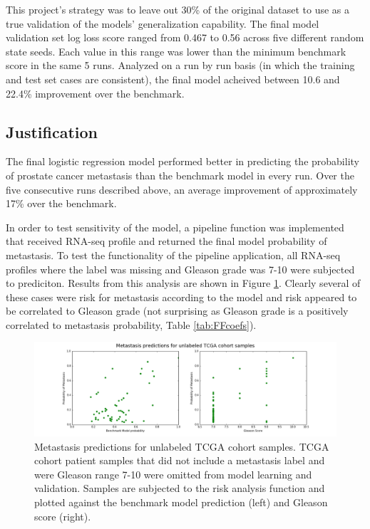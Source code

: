 \documentclass[final]{article}
\begin{document}
This project's strategy was to leave out 30\% of the original dataset to use as a
true validation of the models' generalization capability.  The final model validation
set log loss score ranged from 0.467 to 0.56 across five different random state
seeds.  Each value in this range was lower than the minimum benchmark score in the
same 5 runs.  Analyzed on a run by run basis (in which the training and test set cases
are consistent), the final model acheived between 10.6 and 22.4\% improvement over
the benchmark.

\subsection{Justification}

The final logistic regression model performed better in predicting the
probability of prostate cancer  metastasis than the benchmark model in every
run.  Over the five consecutive runs described above, an average improvement of
approximately 17\%  over the benchmark.

In order to test sensitivity of the model, a pipeline function was implemented
that received RNA-seq profile and returned the final model probability of
metastasis.  To test the functionality of the pipeline application, all RNA-seq
profiles where the label was missing and Gleason grade was 7-10 were subjected
to prediciton.  Results from this analysis are shown in Figure
\ref{fig:missing}.  Clearly several of these cases were risk for metastasis
according to the model and risk appeared to be correlated  to Gleason grade (not
surprising as Gleason grade is a positively correlated to metastasis
probability, Table \ref{tab:FFcoefs}).

\begin{figure}[h]
  \centering
  \includegraphics[width=\textwidth]{missing}
  \caption{\label{fig:missing}Metastasis predictions for unlabeled TCGA cohort samples.  TCGA cohort patient samples that did not include a metastasis label and were Gleason range 7-10 were omitted from model learning and validation.  Samples are subjected to the risk analysis function and plotted against the benchmark model prediction (left) and Gleason score (right).}
\end{figure}
\end{document}
